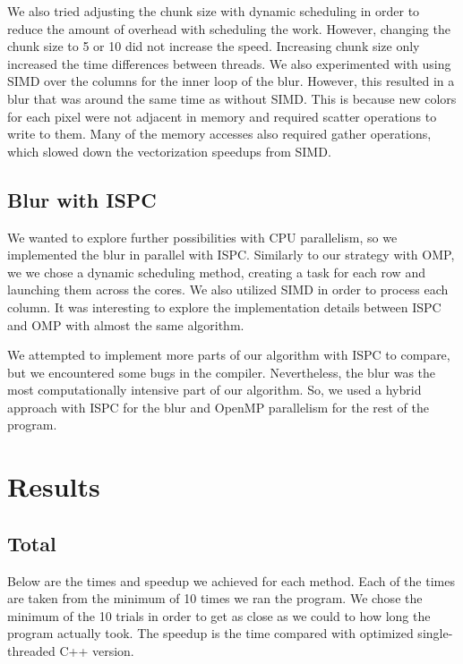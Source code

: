 \documentclass[12pt]{article}
\begin{document}
We also tried adjusting the chunk size with dynamic scheduling in order to
reduce the amount of overhead with scheduling the work. However, changing the
chunk size to 5 or 10 did not increase the speed. Increasing chunk size only
increased the time differences between threads. We also experimented with using
SIMD over the columns for the inner loop of the blur. However, this resulted in
a blur that was around the same time as without SIMD. This is because new
colors for each pixel were not adjacent in memory and required scatter
operations to write to them. Many of the memory accesses also required gather
operations, which slowed down the vectorization speedups from SIMD.

\subsection{Blur with ISPC}

We wanted to explore further possibilities with CPU parallelism, so we
implemented the blur in parallel with ISPC. Similarly to our strategy with OMP,
we we chose a dynamic scheduling method, creating a task for each row and
launching them across the cores. We also utilized SIMD in order to process each
column. It was interesting to explore the implementation details between ISPC
and OMP with almost the same algorithm.

We attempted to implement more parts of our algorithm with ISPC to compare, but
we encountered some bugs in the compiler. Nevertheless, the blur was the most
computationally intensive part of our algorithm. So, we used a hybrid approach
with ISPC for the blur and OpenMP parallelism for the rest of the program.

\section{Results}

\subsection{Total}

Below are the times and speedup we achieved for each method. Each of the times
are taken from the minimum of 10 times we ran the program. We chose the
minimum of the 10 trials in order to get as close as we could to how long
the program actually took. The speedup is the time compared with optimized
single-threaded C++ version.\\
\end{document}
